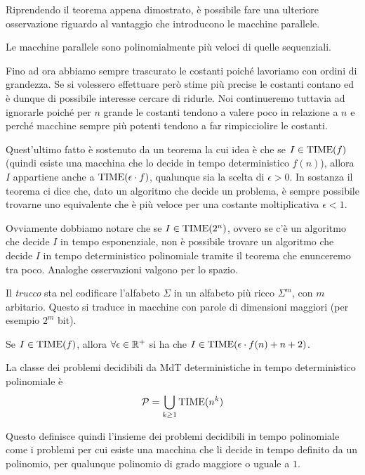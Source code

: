 Riprendendo il teorema appena dimostrato, è possibile fare una
ulteriore osservazione riguardo al vantaggio che introducono le
macchine parallele.

\begin{corollary}
	Le macchine parallele sono polinomialmente più veloci di
	quelle sequenziali.
\end{corollary}

Fino ad ora abbiamo sempre trascurato le costanti poiché
lavoriamo con ordini di grandezza. Se si volessero effettuare
però stime più precise le costanti contano ed è dunque di
possibile interesse cercare di ridurle. Noi continueremo tuttavia
ad ignorarle poiché per $n$ grande le costanti tendono a valere
poco in relazione a $n$ e perché macchine sempre più potenti
tendono a far rimpicciolire le costanti.

Quest'ultimo fatto è sostenuto da un teorema la cui idea è che
se $I \in \operatorname{TIME} (f)$ (quindi esiste una macchina che lo decide
in tempo deterministico $f(n)$), allora $I$ appartiene anche a
$\operatorname{TIME} (\epsilon \cdot f)$, qualunque sia la scelta di
$\epsilon > 0$. In sostanza il teorema ci dice che, dato un
algoritmo che decide un problema, è sempre possibile trovarne
uno equivalente che è più veloce per una costante moltiplicativa
$\epsilon < 1$.

Ovviamente dobbiamo notare che se $I \in \operatorname{TIME}(2^n)$, ovvero se
c'è un algoritmo che decide $I$ in tempo esponenziale, non è
possibile trovare un algoritmo che decide $I$ in tempo
deterministico polinomiale tramite il teorema che enunceremo tra
poco. Analoghe osservazioni valgono per lo spazio.

Il \emph{trucco} sta nel codificare l'alfabeto $\Sigma$ in un
alfabeto più ricco $\Sigma^m$, con $m$ arbitario. Questo si
traduce in macchine con parole di dimensioni maggiori (per
esempio $2^m$ bit).

\begin{theorem}  \label{th: acc_lin}
	Se $I \in \operatorname{TIME} (f)$, allora $\forall \epsilon \in \mathbb{R}^+$ si
	ha che $I \in \operatorname{TIME}(\epsilon \cdot f(n) + n + 2)$.
\end{theorem}

\begin{definition}
	La classe dei problemi decidibili da MdT deterministiche
	in tempo deterministico polinomiale è
	\[ \mathcal{P} = \bigcup_{k \geq 1} \operatorname{TIME} (n^k) \]
\end{definition}

Questo definisce quindi l'insieme dei problemi decidibili in
tempo polinomiale come i problemi per cui esiste una macchina
che li decide in tempo definito da un polinomio, per qualunque
polinomio di grado maggiore o uguale a $1$.

